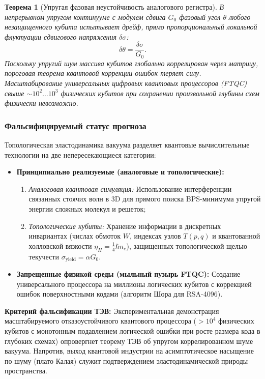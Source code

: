 \documentclass[11pt,a4paper]{article}
\newtheorem{theorem}{Теорема}
\theoremstyle{definition}
\theoremstyle{remark}
\begin{document}
\begin{theorem}[Упругая фазовая неустойчивость аналогового регистра]
\label{thm:analog_phase_instability}
В непрерывном упругом континууме с модулем сдвига $G_0$ фазовый угол $\theta$ любого незащищенного кубита испытывает дрейф, прямо пропорциональный локальной флуктуации сдвигового напряжения $\delta\sigma$:
\begin{equation}
\delta\theta = \frac{\delta\sigma}{G_0}.
\label{eq:phase_drift_formula}
\end{equation}
Поскольку упругий шум массива кубитов глобально коррелирован через матрицу, пороговая теорема квантовой коррекции ошибок теряет силу. Масштабирование универсальных цифровых квантовых процессоров (FTQC) свыше $\sim 10^2 \dots 10^3$ физических кубитов при сохранении произвольной глубины схем физически невозможно.
\end{theorem}

\subsubsection{Фальсифицируемый статус прогноза}

Топологическая эластодинамика вакуума разделяет квантовые вычислительные технологии на две непересекающиеся категории:
\begin{itemize}
\item \textbf{Принципиально реализуемые (аналоговые и топологические):}
\begin{enumerate}
\item \textit{Аналоговая квантовая симуляция:} Использование интерференции связанных стоячих волн в 3D для прямого поиска BPS-минимума упругой энергии сложных молекул и решеток;
\item \textit{Топологические кубиты:} Хранение информации в дискретных инвариантах (числах обмоток $W$, индексах узлов $T(p,q)$ и квантованной холловской вязкости $\eta_H = \frac{1}{4}\hbar n_e$), защищенных топологической щелью текучести $\sigma_{\mathrm{yield}} = \alpha G_0$.
\end{enumerate}
\item \textbf{Запрещенные физикой среды (мыльный пузырь FTQC):}
Создание универсального процессора на миллионы логических кубитов с коррекцией ошибок поверхностными кодами (алгоритм Шора для RSA-4096).
\end{itemize}

\textbf{Критерий фальсификации ТЭВ:} Экспериментальная демонстрация масштабируемого отказоустойчивого квантового процессора ($> 10^4$ физических кубитов с монотонным подавлением логической ошибки при росте размера кода в глубоких схемах) опровергнет теорему ТЭВ об упругом коррелированном шуме вакуума. Напротив, выход квантовой индустрии на асимптотическое насыщение по шуму (плато Калая) служит подтверждением эластодинамической природы пространства.
\end{document}
